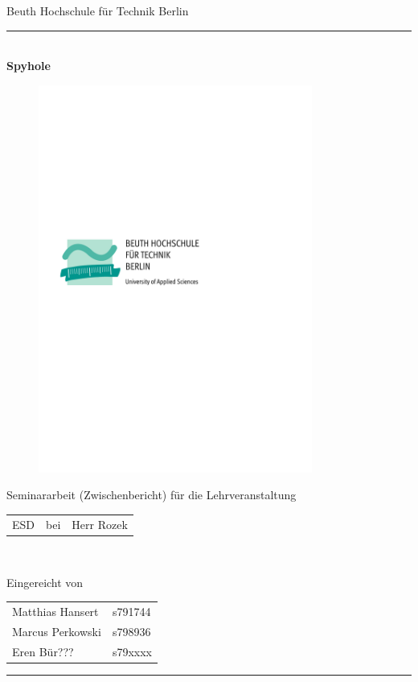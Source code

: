 

\begin{titlepage}
	\begin{center}
		\Large
		Beuth Hochschule für Technik Berlin
		\textcolor{darkBHT}{\rule{\textwidth}{0.2cm}} \\
		\vspace{2 cm}
		\Huge
		\textbf{Spyhole}
		\vspace{2 cm}
		
		\begin{figure}[htbp]
			\centering 
			\includegraphics[width=9cm]{BHT-Logo-Basis.pdf}  
		\end{figure}
		
		\vspace{3cm}
		\Large
		Seminararbeit (Zwischenbericht) für die Lehrveranstaltung \\
		\begin{tabular}{lcl}
			ESD & bei & Herr Rozek\\
		\end{tabular} 
		\\
		\vspace{0.8cm}
		\vspace{0.8cm}
		
		Eingereicht von \\
		\begin{tabular}{ll}
			Matthias Hansert & s791744\\
			Marcus Perkowski & s798936\\
			Eren Bür??? & s79xxxx\\
		\end{tabular}

	\end{center}
	\vfill
	\textcolor{darkBHT}{\rule{\textwidth}{0.2cm}}
	\vspace{1 cm}
	\normalsize
	
\end{titlepage}

%
%